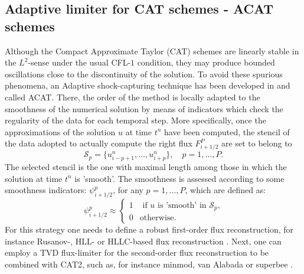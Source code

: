 \subsection{Adaptive limiter for CAT schemes - ACAT schemes} \label{ssec:beyondCAT}
Although the Compact Approximate Taylor (CAT) schemes are linearly stable in the $L^2$-sense under the usual CFL-$1$ condition, they may produce bounded oscillations close to the discontinuity of the solution. 
To avoid these spurious phenomena, an Adaptive \apriori shock-capturing technique has been developed in \cite{CPZMR2020} and called ACAT. There, the order of the method is locally adapted to the smoothness of the numerical solution by means of indicators which check the regularity of the data for each temporal step. More specifically,  once the approximations  of the solution $u$ at time $t^n$ have been computed, the stencil of the data adopted to actually compute the right flux $F_{i+1/2}^P$ are set to belong to 
 $$  \mathcal{S}_p = \{ u_{i-p +1}^n, \dots, u_{i+p}^n\}, \quad p = 1, \dots, P.  $$
 The selected stencil is the one with maximal length among those in which the solution at time $t^n$ is 'smooth'.
 The smoothness is assessed according to some smoothness indicators: $\psi^p_{i+1/2}$, for any $p = 1, \ldots, P$, which are defined as:
\begin{equation}\label{condiconesS0}
\psi^p_{i+1/2} \approx \left\{
\begin{array}{cl}
1 & \mbox { if $u$ is 'smooth' in $\mathcal{S}_p $,}\\
0 & \mbox {otherwise.} 
\end{array}\right.
\end{equation} 
For this strategy one needs to define a robust first-order flux reconstruction, for instance  Rusanov-, HLL- or HLLC-based flux reconstruction \cite{Toro2009,LeVeque2002book}.
Next, one can employ a TVD flux-limiter for the second-order flux reconstruction to be combined with CAT2, such as, for instance minmod, van Alabada or superbee \cite{LeVeque2002book}.

